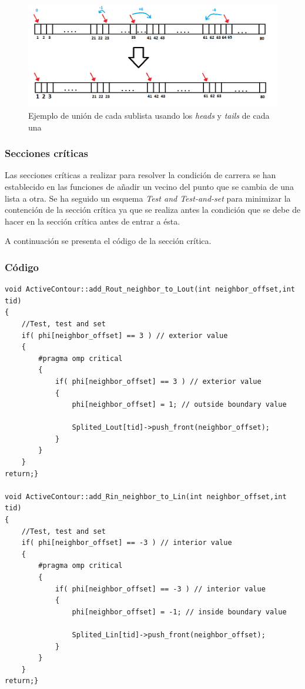  \begin{figure}[H]
 	\captionsetup{justification=centering}
 	\centering
 	\includegraphics[width=1\textwidth]{./imagenes/unionLista2}
 	\caption{Ejemplo de uni\'{o}n de cada sublista usando los \textit{heads} y \textit{tails} de cada una}	
 	\label{unionLista2}
 \end{figure}
 
 
 
 \subsubsection{Secciones cr\'{i}ticas} 
 
 Las secciones cr\'{i}ticas a realizar para resolver la condici\'{o}n de carrera se han establecido en las funciones de a\~{n}adir un vecino del punto que se cambia de una lista a otra. Se ha seguido un esquema \textit{Test and Test-and-set} para minimizar la contenci\'{o}n de la secci\'{o}n cr\'{i}tica ya que se realiza antes la condici\'{o}n que se debe de hacer en la secci\'{o}n cr\'{i}tica antes de entrar a \'{e}sta.
 
 A continuaci\'{o}n se presenta el c\'{o}digo de la secci\'{o}n cr\'{i}tica.


\subsubsection{C\'{o}digo}

\begin{lstlisting}
void ActiveContour::add_Rout_neighbor_to_Lout(int neighbor_offset,int tid)
{
	//Test, test and set
	if( phi[neighbor_offset] == 3 ) // exterior value
	{
		#pragma omp critical
		{
			if( phi[neighbor_offset] == 3 ) // exterior value
			{
				phi[neighbor_offset] = 1; // outside boundary value
	
				Splited_Lout[tid]->push_front(neighbor_offset);	
			}
		}
	}	
return;}

void ActiveContour::add_Rin_neighbor_to_Lin(int neighbor_offset,int tid)
{
	//Test, test and set
	if( phi[neighbor_offset] == -3 ) // interior value
	{
		#pragma omp critical
		{
			if( phi[neighbor_offset] == -3 ) // interior value
			{
				phi[neighbor_offset] = -1; // inside boundary value
			
				Splited_Lin[tid]->push_front(neighbor_offset);
			}
		}
	}	
return;}	
\end{lstlisting}

